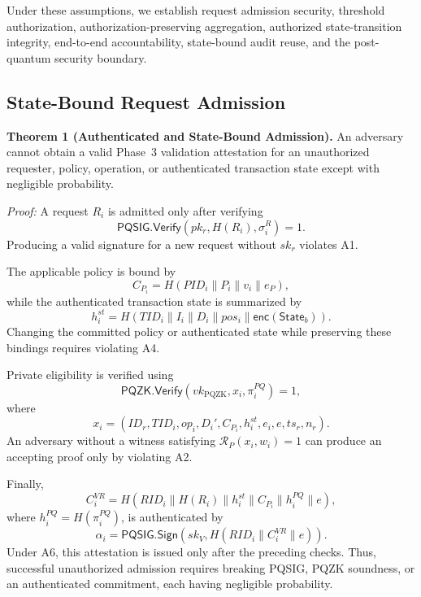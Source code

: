 \documentclass[lettersize,journal]{IEEEtran}
\begin{document}
Under these assumptions, we establish request admission security,
threshold authorization, authorization-preserving aggregation,
authorized state-transition integrity, end-to-end accountability,
state-bound audit reuse, and the post-quantum security boundary.

\subsection{State-Bound Request Admission}

\textbf{Theorem 1 (Authenticated and State-Bound Admission).}
An adversary cannot obtain a valid Phase~3 validation attestation for
an unauthorized requester, policy, operation, or authenticated
transaction state except with negligible probability.

\emph{Proof:}
A request $R_i$ is admitted only after verifying
\begin{equation}
\mathsf{PQSIG.Verify}
(pk_r,H(R_i),\sigma_i^R)=1.
\label{eq:sec_req_auth}
\end{equation}
Producing a valid signature for a new request without $sk_r$ violates
A1.

The applicable policy is bound by
\begin{equation}
C_{P_i}=H(PID_i\parallel P_i\parallel v_i\parallel e_P),
\end{equation}
while the authenticated transaction state is summarized by
\begin{equation}
h_i^{st}
=
H(TID_i\parallel I_i\parallel D_i\parallel pos_i
\parallel\mathsf{enc}(\mathsf{State}_b)).
\label{eq:sec_state_digest}
\end{equation}
Changing the committed policy or authenticated state while preserving
these bindings requires violating A4.

Private eligibility is verified using
\begin{equation}
\mathsf{PQZK.Verify}
(vk_{\mathrm{PQZK}},x_i,\pi_i^{PQ})=1,
\end{equation}
where
\begin{equation}
x_i=
(ID_r,TID_i,op_i,D_i',C_{P_i},h_i^{st},
e_i,e,ts_r,n_r).
\end{equation}
An adversary without a witness satisfying
$\mathcal{R}_P(x_i,w_i)=1$ can produce an accepting proof only by
violating A2.

Finally,
\begin{equation}
C_i^{VR}
=
H(RID_i\parallel H(R_i)\parallel h_i^{st}
\parallel C_{P_i}\parallel h_i^{PQ}\parallel e),
\end{equation}
where $h_i^{PQ}=H(\pi_i^{PQ})$, is authenticated by
\begin{equation}
\alpha_i=
\mathsf{PQSIG.Sign}
(sk_V,H(RID_i\parallel C_i^{VR}\parallel e)).
\end{equation}
Under A6, this attestation is issued only after the preceding checks.
Thus, successful unauthorized admission requires breaking PQSIG,
PQZK soundness, or an authenticated commitment, each having negligible
probability.
\end{document}
